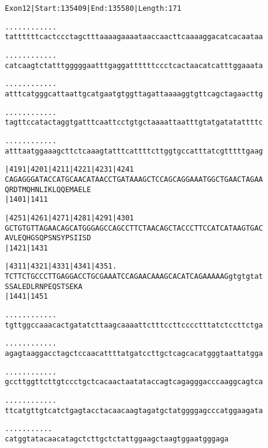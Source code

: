 \documentclass{article}
\begin{document}
\begin{alltt}
Exon 12 | Start: 135409 | End: 135580 | Length: 171

.    .    .    .    .    .    .    .    .    .    .    .    
tattttttcactccctagctttaaaagaaaataaccaacttcaaaaggacatcacaataa

.    .    .    .    .    .    .    .    .    .    .    .    
catcaagtctatttgggggaatttgaggattttttccctcactaacatcatttggaaata

.    .    .    .    .    .    .    .    .    .    .    .    
atttcatgggcattaattgcatgaatgtggttagattaaaaggtgttcagctagaacttg

.    .    .    .    .    .    .    .    .    .    .    .    
tagttccatactaggtgatttcaattcctgtgctaaaattaatttgtatgatatattttc

.    .    .    .    .    .    .    .    .    .    .    .    
atttaatggaaagcttctcaaagtatttcattttcttggtgccatttatcgtttttgaag

     |4191     |4201     |4211     |4221     |4231     |4241
CAGAGGGATACCATGCAACATAACCTGATAAAGCTCCAGCAGGAAATGGCTGAACTAGAA
Q  R  D  T  M  Q  H  N  L  I  K  L  Q  Q  E  M  A  E  L  E  
               |1401                         |1411          

     |4251     |4261     |4271     |4281     |4291     |4301
GCTGTGTTAGAACAGCATGGGAGCCAGCCTTCTAACAGCTACCCTTCCATCATAAGTGAC
A  V  L  E  Q  H  G  S  Q  P  S  N  S  Y  P  S  I  I  S  D  
               |1421                         |1431          

     |4311     |4321     |4331     |4341     |4351      .   
TCTTCTGCCCTTGAGGACCTGCGAAATCCAGAACAAAGCACATCAGAAAAAGgtgtgtat
S  S  A  L  E  D  L  R  N  P  E  Q  S  T  S  E  K  A        
               |1441                         |1451          

 .    .    .    .    .    .    .    .    .    .    .    .   
tgttggccaaacactgatatcttaagcaaaattctttccttcccctttatctccttctga

 .    .    .    .    .    .    .    .    .    .    .    .   
agagtaaggacctagctccaacattttatgatccttgctcagcacatgggtaattatgga

 .    .    .    .    .    .    .    .    .    .    .    .   
gccttggttcttgtccctgctcacaactaatataccagtcagagggacccaaggcagtca

 .    .    .    .    .    .    .    .    .    .    .    .   
ttcatgttgtcatctgagtacctacaacaagtagatgctatggggagcccatggaagata

\end{alltt}
\newpage
\begin{alltt}
 .    .    .    .    .    .    .    .    .    .    .
catggtatacaacatagctcttgctctattggaagctaagtggaatgggaga
\end{alltt}
\end{document}

